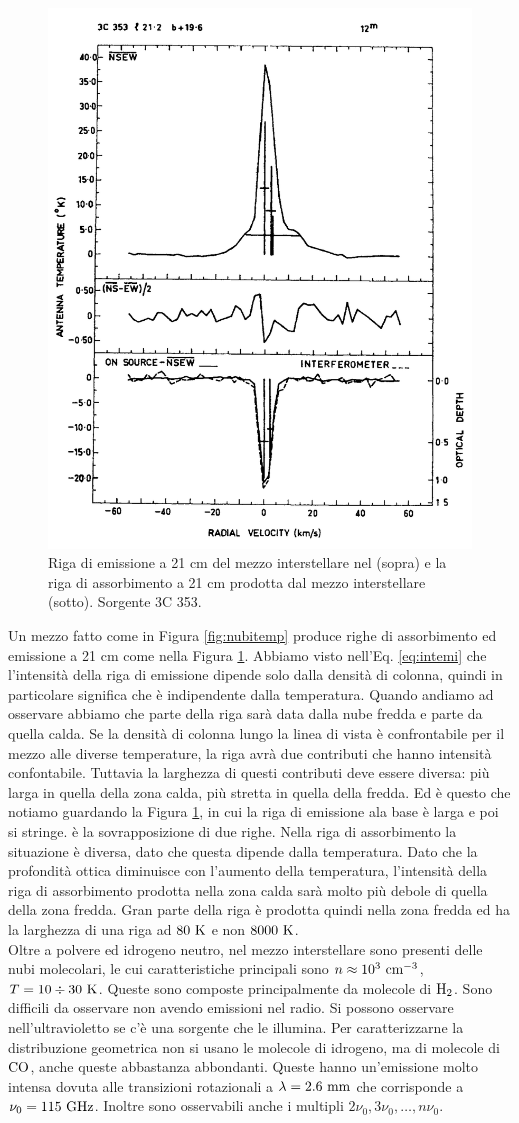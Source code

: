 \begin{figure}[b!]
    \centering
    \includegraphics[width=.4\columnwidth]{images/assoemi.png}
    \caption{Riga di emissione a 21 cm del mezzo interstellare nel (sopra) e la riga di assorbimento a 21 cm prodotta dal mezzo interstellare (sotto). Sorgente 3C 353.}
    \label{fig:assoemi}
\end{figure}
Un mezzo fatto come in Figura \ref{fig:nubitemp} produce righe di assorbimento ed emissione a 21 cm come nella Figura \ref{fig:assoemi}. Abbiamo visto nell'Eq. \ref{eq:intemi} che l'intensità della riga di emissione dipende solo dalla densità di colonna, quindi in particolare significa che è indipendente dalla temperatura. Quando andiamo ad osservare abbiamo che parte della riga sarà data dalla nube fredda e parte da quella calda. Se la densità di colonna lungo la linea di vista è confrontabile per il mezzo alle diverse temperature, la riga avrà due contributi che hanno intensità confontabile. Tuttavia la larghezza di questi contributi deve essere diversa: più larga in quella della zona calda, più stretta in quella della fredda. Ed è questo che notiamo guardando la Figura \ref{fig:assoemi}, in cui la riga di emissione ala base è larga e poi si stringe. è la sovrapposizione di due righe. Nella riga di assorbimento la situazione è diversa, dato che questa dipende dalla temperatura. Dato che la profondità ottica diminuisce con l'aumento della temperatura, l'intensità della riga di assorbimento prodotta nella zona calda sarà molto più debole di quella della zona fredda. Gran parte della riga è prodotta quindi nella zona fredda ed ha la larghezza di una riga ad $80\text{ K}$ e non $8000\text{ K}$.\\
Oltre a polvere ed idrogeno neutro, nel mezzo interstellare sono presenti delle nubi molecolari, le cui caratteristiche principali sono $n\approx 10^3\text{ cm}^{-3}$, $T=10\div30\text{ K}$. Queste sono composte principalmente da molecole di $\ce{H2}$. Sono difficili da osservare non avendo emissioni nel radio. Si possono osservare nell'ultravioletto se c'è una sorgente che le illumina. Per caratterizzarne la distribuzione geometrica non si usano le molecole di idrogeno, ma di molecole di $\ce{CO}$, anche queste abbastanza abbondanti. Queste hanno un'emissione molto intensa dovuta alle transizioni rotazionali a $\lambda =2.6\text{ mm}$ che corrisponde a $\nu_0 = 115\text{ GHz}$. Inoltre sono osservabili anche i multipli $2\nu_0,3\nu_0,\dots,n\nu_0$.\\

